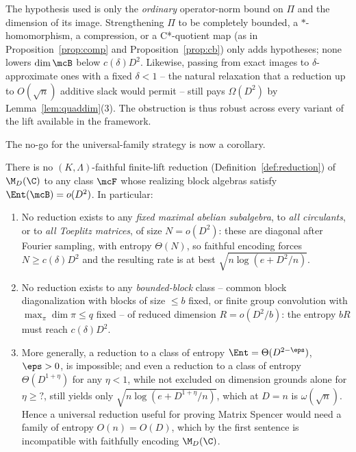 \begin{remark}\label{rem:cb}
The hypothesis used is only the \emph{ordinary} operator-norm bound on $\Pi$ and
the dimension of its image. Strengthening $\Pi$ to be completely bounded, a
$*$-homomorphism, a compression, or a C*-quotient map (as in
Proposition~\ref{prop:comp} and Proposition~\ref{prop:cb}) only adds hypotheses;
none lowers $\dim\mcB$ below $c(\delta)D^2$. Likewise, passing from exact images to
$\delta$-approximate ones with a fixed $\delta<1$ -- the natural relaxation that a
reduction up to $O(\sqrt n)$ additive slack would permit -- still pays
$\Omega(D^2)$ by Lemma~\ref{lem:quaddim}(3). The obstruction is thus robust across
every variant of the lift available in the framework.
\end{remark}

The no-go for the universal-family strategy is now a corollary.

\begin{theorem}\label{thm:nogo}
There is no $(K,\Lambda)$-faithful finite-lift reduction (Definition~\ref{def:reduction})
of $\M_D(\C)$ to any class $\mcF$ whose realizing block algebras satisfy
$\Ent(\mcB)=o(D^2)$. In particular:
\begin{enumerate}[leftmargin=2em]
\item No reduction exists to any \emph{fixed maximal abelian subalgebra}, to
\emph{all circulants}, or to \emph{all Toeplitz matrices}, of size $N=o(D^2)$:
these are diagonal after Fourier sampling, with entropy $\Theta(N)$, so faithful
encoding forces $N\ge c(\delta)D^2$ and the resulting rate is at best
$\sqrt{n\log(e+D^2/n)}$.
\item No reduction exists to any \emph{bounded-block} class -- common block
diagonalization with blocks of size $\le b$ fixed, or finite group convolution
with $\max_\pi\dim\pi\le q$ fixed -- of reduced dimension $R=o(D^2/b)$: the
entropy $bR$ must reach $c(\delta)D^2$.
\item More generally, a reduction to a class of entropy $\Ent=\Theta(D^{2-\eps})$,
$\eps>0$, is impossible; and even a reduction to a class of entropy
$\Theta(D^{1+\eta})$ for any $\eta<1$, while not excluded on dimension grounds
alone for $\eta\ge\!?$, still yields only $\sqrt{n\log(e+D^{1+\eta}/n)}$, which at
$D=n$ is $\omega(\sqrt n)$. Hence a universal reduction useful for proving Matrix
Spencer would need a family of entropy $O(n)=O(D)$, which by the first sentence is
incompatible with faithfully encoding $\M_D(\C)$.
\end{enumerate}
\end{theorem}

